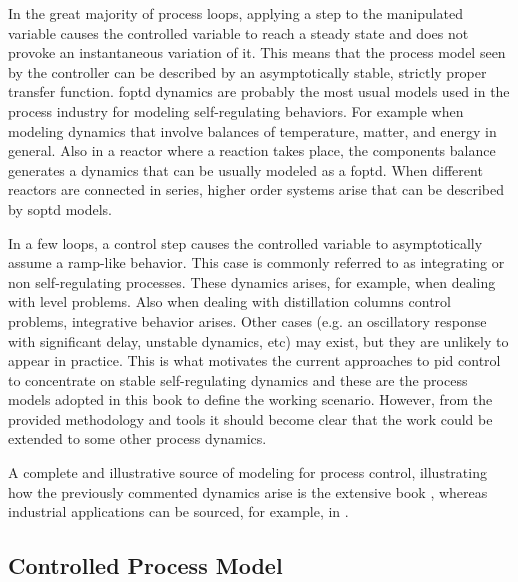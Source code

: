 In the great majority of process loops, applying a step to the manipulated variable causes the controlled variable to reach a steady state and does not provoke an instantaneous variation of it. This means that the process model seen by the controller can be described by an asymptotically stable, strictly proper transfer function. \gls{foptd} dynamics are probably the most usual models used in the process industry for modeling self-regulating behaviors. For example when modeling dynamics that involve balances of temperature, matter, and energy in general. Also in a reactor where a reaction takes place, the components balance generates a dynamics that can be usually modeled as a \gls{foptd}. When different reactors are connected in series, higher order systems arise that can be described by \gls{soptd} models. 

In a few loops, a control step causes the controlled variable to asymptotically assume a ramp-like behavior. This case is commonly referred to as  integrating or non self-regulating processes. These dynamics arises, for example, when dealing with level problems. Also when dealing with distillation columns control problems, integrative behavior arises. Other cases (e.g. an oscillatory response with significant delay, unstable dynamics, etc) may exist, but they are unlikely to appear in practice. This is what motivates the current approaches to \gls{pid} control to concentrate on stable self-regulating dynamics and these are the process models adopted in this book to define the working scenario. However, from the provided methodology and tools it should become clear that the work could be extended to some other process dynamics.

A complete and illustrative source of modeling for process control, illustrating how the previously commented dynamics arise is the extensive book \citep{MarlinBook}, whereas industrial applications can be sourced, for example, in  \citep{VilanovaBook2012}.


\subsection{Controlled Process Model}
\label{sec:2.1}


